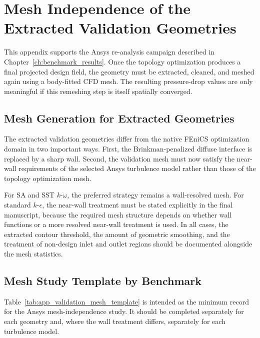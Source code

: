 \chapter[Mesh Independence of Validation Geometries]{Mesh Independence of the Extracted Validation Geometries}
\label{app:grid_independence_optimized}

\providecommand{\meshplaceholder}[1]{%
	\fbox{\parbox[c][0.20\textheight][c]{0.88\linewidth}{\centering \textbf{Placeholder}\\[0.5em]#1}}%
}

This appendix supports the Ansys re-analysis campaign described in Chapter~\ref{ch:benchmark_results}. Once the topology optimization produces a final projected design field, the geometry must be extracted, cleaned, and meshed again using a body-fitted CFD mesh. The resulting pressure-drop values are only meaningful if this remeshing step is itself spatially converged.

\section{Mesh Generation for Extracted Geometries}
The extracted validation geometries differ from the native FEniCS optimization domain in two important ways. First, the Brinkman-penalized diffuse interface is replaced by a sharp wall. Second, the validation mesh must now satisfy the near-wall requirements of the selected Ansys turbulence model rather than those of the topology optimization mesh.

For SA and SST $k$-$\omega$, the preferred strategy remains a wall-resolved mesh. For standard $k$-$\epsilon$, the near-wall treatment must be stated explicitly in the final manuscript, because the required mesh structure depends on whether wall functions or a more resolved near-wall treatment is used. In all cases, the extracted contour threshold, the amount of geometric smoothing, and the treatment of non-design inlet and outlet regions should be documented alongside the mesh statistics.

\section{Mesh Study Template by Benchmark}
Table~\ref{tab:app_validation_mesh_template} is intended as the minimum record for the Ansys mesh-independence study. It should be completed separately for each geometry and, where the wall treatment differs, separately for each turbulence model.

